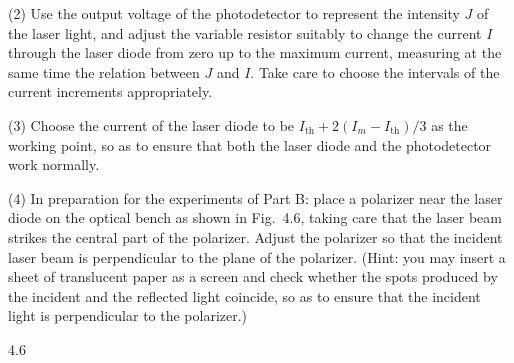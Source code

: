 (2) Use the output voltage of the photodetector to represent the intensity $J$ of the laser light, and adjust the variable resistor suitably to change the current $I$ through the laser diode from zero up to the maximum current, measuring at the same time the relation between $J$ and $I$. Take care to choose the intervals of the current increments appropriately.

\begin{center}
\end{center}

\begin{center}
\end{center}

(3) Choose the current of the laser diode to be $I_{\mathrm{th}}+2(I_m-I_{\mathrm{th}})/3$ as the working point, so as to ensure that both the laser diode and the photodetector work normally.

(4) In preparation for the experiments of Part B: place a polarizer near the laser diode on the optical bench as shown in Fig.~4.6, taking care that the laser beam strikes the central part of the polarizer. Adjust the polarizer so that the incident laser beam is perpendicular to the plane of the polarizer. (Hint: you may insert a sheet of translucent paper as a screen and check whether the spots produced by the incident and the reflected light coincide, so as to ensure that the incident light is perpendicular to the polarizer.)

\begin{figbox}{4.6}
\end{figbox}


